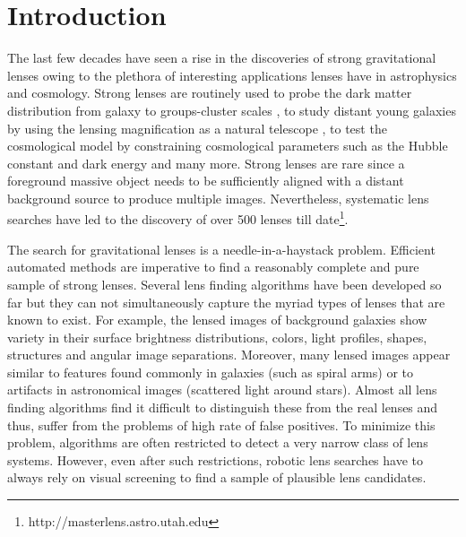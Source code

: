 \documentclass[useAMS,usenatbib,a4paper]{mn2e}
\begin{document}
\setcounter{footnote}{1}


\section{Introduction}
\label{sec:intro}

The last few decades have seen a rise in the discoveries of strong
gravitational lenses owing to the plethora of interesting applications
lenses have in astrophysics and cosmology. Strong lenses are routinely
used to probe the dark matter distribution from galaxy
\citep[e.g.][]{Koopmans2006,Barnabe2009,Sonnenfeld2015} to groups-cluster
scales
\citep[e.g.][]{Limousin2008,Zitrin2011,Oguri2012,More2012,Newman2013}, to
study distant young galaxies by using the lensing magnification as a
natural telescope \citep[e.g.][]{Zitrin2009,Zheng2012,Whitaker2014}, to
test the cosmological model by constraining cosmological parameters such
as the Hubble constant and dark energy
\citep[e.g.][]{Suyu2010,Collett2012,Collett2014,Sereno2014} and many more. Strong
lenses are rare since a foreground massive object needs to be
sufficiently aligned with a distant background source to produce
multiple images. Nevertheless, systematic lens searches have led to the
discovery of over 500 lenses till
date\footnote{http://masterlens.astro.utah.edu}.

The search for gravitational lenses is a needle-in-a-haystack problem.
Efficient automated methods are imperative to find a reasonably complete
and pure sample of strong lenses. Several lens finding algorithms have
been developed so far 
\citep[e.g.][]{Lenzen2004,Alard2006,Seidel2007,More2012,Gavazzi2014} but they can not
simultaneously capture the myriad types of lenses that are known to
exist. For example, the lensed images of background galaxies show
variety in their surface brightness distributions, colors, light
profiles, shapes, structures and angular image separations.  Moreover,
many lensed images appear similar to features found commonly in galaxies
(such as spiral arms) or to artifacts in astronomical images (scattered
light around stars).  Almost all lens finding algorithms find it
difficult to distinguish these from the real lenses and thus, suffer
from the problems of high rate of false positives.  To minimize this problem,
algorithms are often restricted to detect a very narrow class of lens
systems. However, even after such restrictions, robotic lens searches
have to always rely on visual screening to find a sample of plausible
lens candidates.
\end{document}
